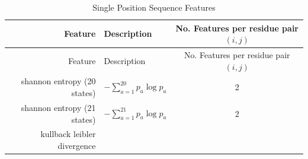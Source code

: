 \documentclass[12pt,a4paper,twoside]{book}
\theoremstyle{definition}
\theoremstyle{definition}
\theoremstyle{remark}
\begin{document}
\begin{longtable}[]{@{}rlc@{}}
\caption{Single Position Sequence Features}\tabularnewline
\toprule
\begin{minipage}[b]{0.23\columnwidth}\raggedleft\strut
Feature\strut
\end{minipage} & \begin{minipage}[b]{0.50\columnwidth}\raggedright\strut
Description\strut
\end{minipage} & \begin{minipage}[b]{0.18\columnwidth}\centering\strut
No. Features per residue pair \((i, j)\)\strut
\end{minipage}\tabularnewline
\midrule
\endfirsthead
\toprule
\begin{minipage}[b]{0.23\columnwidth}\raggedleft\strut
Feature\strut
\end{minipage} & \begin{minipage}[b]{0.50\columnwidth}\raggedright\strut
Description\strut
\end{minipage} & \begin{minipage}[b]{0.18\columnwidth}\centering\strut
No. Features per residue pair \((i, j)\)\strut
\end{minipage}\tabularnewline
\midrule
\endhead
\begin{minipage}[t]{0.23\columnwidth}\raggedleft\strut
shannon entropy (20 states)\strut
\end{minipage} & \begin{minipage}[t]{0.50\columnwidth}\raggedright\strut
\(- \sum_{a=1}^{20} p_a \log p_a\)\strut
\end{minipage} & \begin{minipage}[t]{0.18\columnwidth}\centering\strut
2\strut
\end{minipage}\tabularnewline
\begin{minipage}[t]{0.23\columnwidth}\raggedleft\strut
shannon entropy (21 states)\strut
\end{minipage} & \begin{minipage}[t]{0.50\columnwidth}\raggedright\strut
\(- \sum_{a=1}^{21} p_a \log p_a\)\strut
\end{minipage} & \begin{minipage}[t]{0.18\columnwidth}\centering\strut
2\strut
\end{minipage}\tabularnewline
\begin{minipage}[t]{0.23\columnwidth}\raggedleft\strut
kullback leibler divergence\strut
\end{minipage} & \begin{minipage}[t]{0.50\columnwidth}\raggedright\strut

\end{minipage}
\end{longtable}
\end{document}
